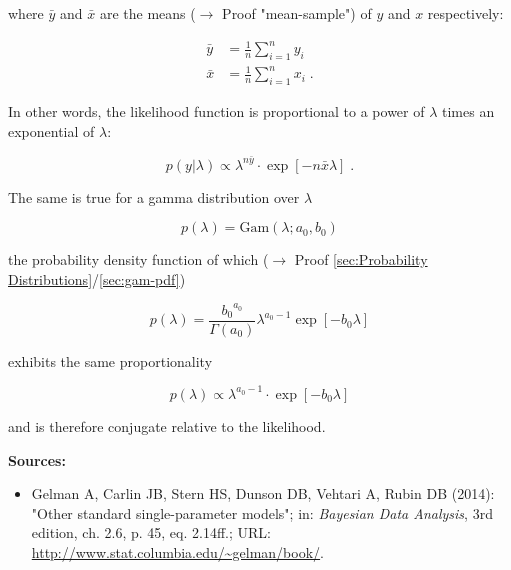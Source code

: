 \documentclass[a4paper,12pt,twoside]{book}
\begin{document}
where $\bar{y}$ and $\bar{x}$ are the means ($\rightarrow$ Proof "mean-sample") of $y$ and $x$ respectively:

\begin{equation} \label{eq:poissexp-prior-xy-mean}
\begin{split}
\bar{y} &= \frac{1}{n} \sum_{i=1}^n y_i \\
\bar{x} &= \frac{1}{n} \sum_{i=1}^n x_i \; .
\end{split}
\end{equation}

In other words, the likelihood function is proportional to a power of $\lambda$ times an exponential of $\lambda$:

\begin{equation} \label{eq:poissexp-prior-Poiss-exp-LF-prop}
p(y|\lambda) \propto \lambda^{n \bar{y}} \cdot \exp\left[-n \bar{x} \lambda\right] \; .
\end{equation}

The same is true for a gamma distribution over $\lambda$

\begin{equation} \label{eq:poissexp-prior-Poiss-exp-prior-s1}
p(\lambda) = \mathrm{Gam}(\lambda; a_0, b_0)
\end{equation}

the probability density function of which ($\rightarrow$ Proof \ref{sec:Probability Distributions}/\ref{sec:gam-pdf})

\begin{equation} \label{eq:poissexp-prior-Poiss-exp-prior-s2}
p(\lambda) = \frac{ {b_0}^{a_0}}{\Gamma(a_0)} \lambda^{a_0-1} \exp[-b_0 \lambda]
\end{equation}

exhibits the same proportionality

\begin{equation} \label{eq:poissexp-prior-Poiss-exp-prior-s3}
p(\lambda) \propto \lambda^{a_0-1} \cdot \exp[-b_0 \lambda]
\end{equation}

and is therefore conjugate relative to the likelihood.


\vspace{1em}
\textbf{Sources:}
\begin{itemize}
\item Gelman A, Carlin JB, Stern HS, Dunson DB, Vehtari A, Rubin DB (2014): "Other standard single-parameter models"; in: \textit{Bayesian Data Analysis}, 3rd edition, ch. 2.6, p. 45, eq. 2.14ff.; URL: \url{http://www.stat.columbia.edu/~gelman/book/}.
\end{itemize}
\end{document}
